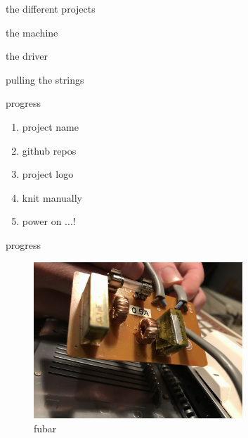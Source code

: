 \documentclass{beamer}
\begin{document}

\begin{frame}{the different projects}
    \begin{description}[<+->]
        \item [knitt] the machine
        \item [michael] the driver
        \item [devon] pulling the strings
    \end{description}
\end{frame}


\begin{frame}{progress}
    \begin{enumerate}
        \item project name \pause \emojiCheck \pause
        \item github repos \pause \emojiCheck \pause
        \item project logo \pause \emojiCheck \pause
        \item knit manually \pause \emojiCheck \pause
        \item power on ...! \pause
    \end{enumerate}

    \center
     \pause %
     \pause %
     \pause %
     \pause %
\end{frame}

\begin{frame}{progress}
    \begin{figure}
        \includegraphics[width=0.7\textwidth]{./images/exploded-capacitor.png}
        \caption{fubar}
    \end{figure}
\end{frame}
\end{document}
